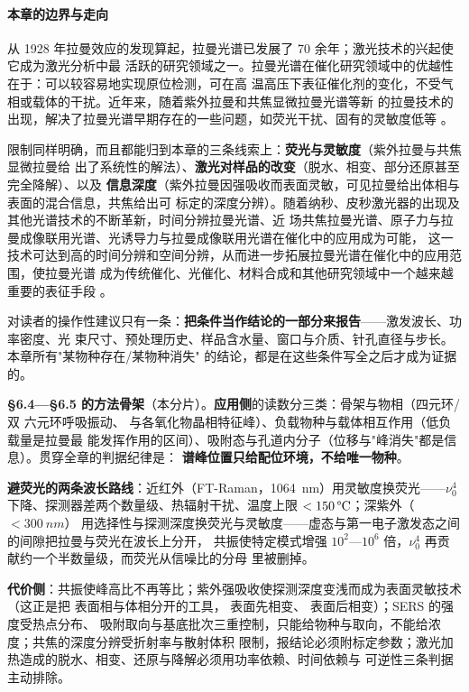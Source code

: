 \paragraph{本章的边界与走向}
从 1928 年拉曼效应的发现算起，拉曼光谱已发展了 70 余年；激光技术的兴起使它成为激光分析中最
活跃的研究领域之一。拉曼光谱在催化研究领域中的优越性在于：可以较容易地实现原位检测，可在高
温高压下表征催化剂的变化，不受气相或载体的干扰。近年来，随着紫外拉曼和共焦显微拉曼光谱等新
的拉曼技术的出现，解决了拉曼光谱早期存在的一些问题，如荧光干扰、固有的灵敏度低等
。

限制同样明确，而且都能归到本章的三条线索上：\textbf{荧光与灵敏度}（紫外拉曼与共焦显微拉曼给
出了系统性的解法）、\textbf{激光对样品的改变}（脱水、相变、部分还原甚至完全降解）、以及
\textbf{信息深度}（紫外拉曼因强吸收而表面灵敏，可见拉曼给出体相与表面的混合信息，共焦给出可
标定的深度分辨）。随着纳秒、皮秒激光器的出现及其他光谱技术的不断革新，时间分辨拉曼光谱、近
场共焦拉曼光谱、原子力与拉曼成像联用光谱、光诱导力与拉曼成像联用光谱在催化中的应用成为可能，
这一技术可达到高的时间分辨和空间分辨，从而进一步拓展拉曼光谱在催化中的应用范围，使拉曼光谱
成为传统催化、光催化、材料合成和其他研究领域中一个越来越重要的表征手段
。

对读者的操作性建议只有一条：\textbf{把条件当作结论的一部分来报告}——激发波长、功率密度、光
束尺寸、预处理历史、样品含水量、窗口与介质、针孔直径与步长。本章所有"某物种存在/某物种消失"
的结论，都是在这些条件写全之后才成为证据的。

\begin{methodsum}
\textbf{§6.4—§6.5 的方法骨架}（本分片）。\textbf{应用侧}的读数分三类：骨架与物相（四元环/双
六元环呼吸振动、 与各氧化物晶相特征峰）、负载物种与载体相互作用（低负载量是拉曼最
能发挥作用的区间）、吸附态与孔道内分子（位移与"峰消失"都是信息）。贯穿全章的判据纪律是：
\textbf{谱峰位置只给配位环境，不给唯一物种}。

\textbf{避荧光的两条波长路线}：近红外（FT-Raman，\qty{1064}{nm}）用灵敏度换荧光——$\nu_0^4$
下降、探测器差两个数量级、热辐射干扰、温度上限 $<\qty{150}{\degC}$；深紫外（$<\qty{300}{nm}$）
用选择性与探测深度换荧光与灵敏度——虚态与第一电子激发态之间的间隙把拉曼与荧光在波长上分开，
共振使特定模式增强 $10^2$—$10^6$ 倍，$\nu_0^4$ 再贡献约一个半数量级，而荧光从信噪比的分母
里被删掉。

\textbf{代价侧}：共振使峰高比不再等比；紫外强吸收使探测深度变浅而成为表面灵敏技术（这正是把
表面相与体相分开的工具， 表面先相变、 表面后相变）；SERS 的强度受热点分布、
吸附取向与基底批次三重控制，只能给物种与取向，不能给浓度；共焦的深度分辨受折射率与散射体积
限制，报结论必须附标定参数；激光加热造成的脱水、相变、还原与降解必须用功率依赖、时间依赖与
可逆性三条判据主动排除。
\end{methodsum}

